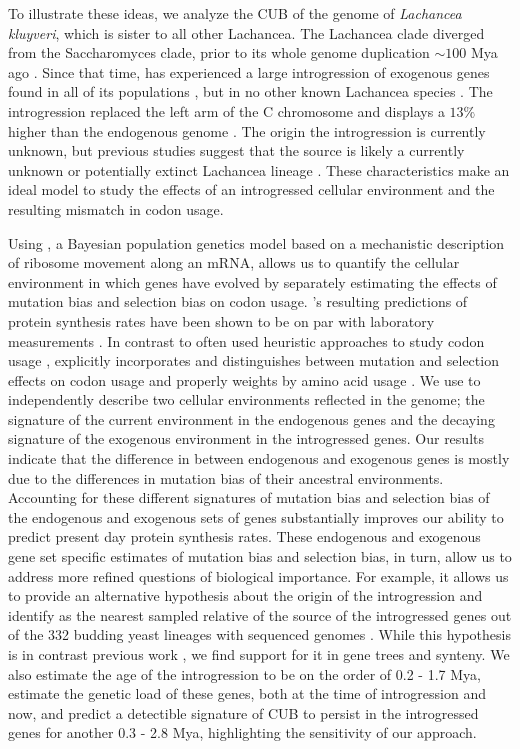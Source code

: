 \documentclass[fleqn,letterpaper]{article}
\begin{document}
To illustrate these ideas, we analyze the CUB of the genome of \emph{Lachancea kluyveri}, which is sister to all other Lachancea.
The Lachancea clade diverged from the Saccharomyces clade, prior to its whole genome duplication $\sim 100$ Mya ago \citep{MHM2015,Beimforde2014}.
Since that time, \kluyveri has experienced a large introgression of exogenous genes found in all of its populations \citep{friedrich2015}, but in no other known Lachancea species \citep{vakirlis2016}.
The introgression replaced the left arm of the C chromosome and displays a $13 \%$ higher \GC than the endogenous \kluyveri genome \citep{payen2009, friedrich2015}.
The origin the introgression is currently unknown, but previous studies suggest that the source is likely a currently unknown or potentially extinct Lachancea lineage \citep{payen2009, friedrich2015, vakirlis2016, brion2017}.
These characteristics make \kluyveri an ideal model to study the effects of an introgressed cellular environment and the resulting mismatch in codon usage.

Using \ROC, a Bayesian population genetics model based on a mechanistic description of ribosome movement along an mRNA, allows us to quantify the cellular environment in which genes have evolved by separately estimating the effects of mutation bias and selection bias on codon usage.
\ROC's resulting predictions of protein synthesis rates have been shown to be on par with laboratory measurements \citep{ShahAndGilchrist2011, gilchrist2015}.
In contrast to often used heuristic approaches to study codon usage \citep{sharp1987, Wright1990, dosreis2004}, \ROC explicitly incorporates and distinguishes between mutation and selection effects on codon usage and properly weights by amino acid usage \citep{cope2018}.
We use \ROC to independently describe two cellular environments reflected in the \kluyveri genome; the signature of the current environment in the endogenous genes and the decaying signature of the exogenous environment in the introgressed genes.
Our results indicate that the difference in \GC between endogenous and exogenous genes is mostly due to the differences in mutation bias of their ancestral environments.
Accounting for these different signatures of mutation bias and selection bias of the endogenous and exogenous sets of genes substantially improves our ability to predict present day protein synthesis rates.
These endogenous and exogenous gene set specific estimates of mutation bias and selection bias, in turn, allow us to address more refined questions of biological importance.
For example, it allows us to provide an alternative hypothesis about the origin of the introgression and identify \gossypii as the nearest sampled relative of the source of the introgressed genes out of the 332 budding yeast lineages with sequenced genomes \citep{shen2018}.
While this hypothesis is in contrast previous work \citep{payen2009, friedrich2015, vakirlis2016, brion2017}, we find support for it in gene trees and synteny.
We also estimate the age of the introgression to be on the order of 0.2 - 1.7 Mya, estimate the genetic load of these genes, both at the time of introgression and now, and predict a detectible signature of CUB to persist in the introgressed genes for another 0.3 - 2.8 Mya, highlighting the sensitivity of our approach.
\end{document}
